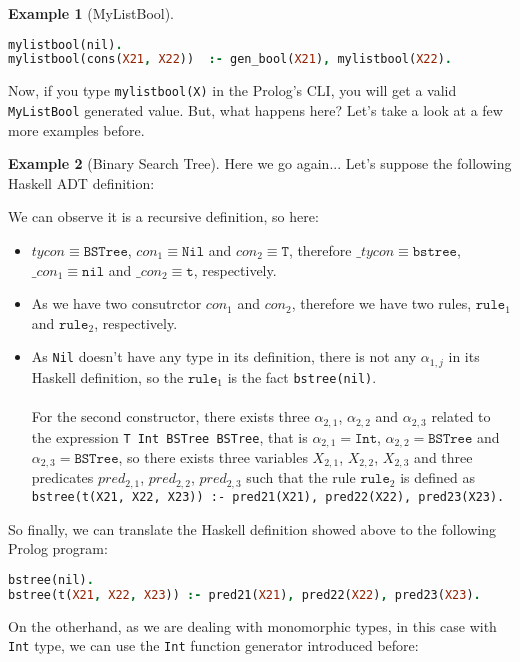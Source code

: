 \documentclass{report}
\theoremstyle{definition}
\newtheorem{example}{Example}[section]
\theoremstyle{definition}
\newcommand{\ttt}[1]{\texttt{#1}}
\begin{document}
\begin{example}[MyListBool]
\begin{lstlisting}[language=Prolog]
mylistbool(nil).																										%% rule 1
mylistbool(cons(X21, X22)) 	:- gen_bool(X21), mylistbool(X22).			%% rule 2
\end{lstlisting}
Now, if you type \ttt{mylistbool(X)} in the Prolog's CLI, you will get a valid \ttt{MyListBool} generated value. But, what happens here? Let's take a look at a few more examples before.
\end{example}
\begin{example}[Binary Search Tree]
	Here we go again... Let's suppose the following Haskell ADT definition:
	
	We can observe it is a recursive definition, so here:
	\begin{itemize}
		\item $tycon \equiv \ttt{BSTree}$, $con_1 \equiv \ttt{Nil}$ and $con_2 \equiv \ttt{T}$, therefore $\_tycon \equiv \ttt{bstree}$, $\_con_1 \equiv \ttt{nil}$ and $\_con_2 \equiv \ttt{t}$, respectively.
		\item As we have two consutrctor $con_1$ and $con_2$, therefore we have two rules, $\ttt{rule}_1$ and $\ttt{rule}_2$, respectively.
		\item As \ttt{Nil} doesn't have any type in its definition, there is not any $\alpha_{1,j}$ in its Haskell definition, so the $\ttt{rule}_1$ is the fact \ttt{bstree(nil)}.\\\\
		For the second constructor, there exists three $\alpha_{2,1}$, $\alpha_{2,2}$ and $\alpha_{2,3}$ related to the expression \ttt{T Int BSTree BSTree}, that is $\alpha_{2,1} = \ttt{Int}$, $\alpha_{2,2} = \ttt{BSTree}$ and $\alpha_{2,3} = \ttt{BSTree}$, so there exists three variables $X_{2,1}$, $X_{2,2}$, $X_{2,3}$ and three predicates $pred_{2,1}$, $pred_{2,2}$, $pred_{2,3}$ such that the rule $\ttt{rule}_2$ is defined as \\ \ttt{bstree(t(X21, X22, X23)) :- pred21(X21), pred22(X22), pred23(X23).}
	\end{itemize}
	So finally, we can translate the Haskell definition showed above to the following Prolog program:\\
\begin{lstlisting}[language=Prolog]
bstree(nil).																														%% rule 1
bstree(t(X21, X22, X23)) :- pred21(X21), pred22(X22), pred23(X23).			%% rule 2
\end{lstlisting}
On the otherhand, as we are dealing with monomorphic types, in this case with \ttt{Int} type, we can use the \ttt{Int} function generator introduced before:\\

\end{example}
\end{document}
